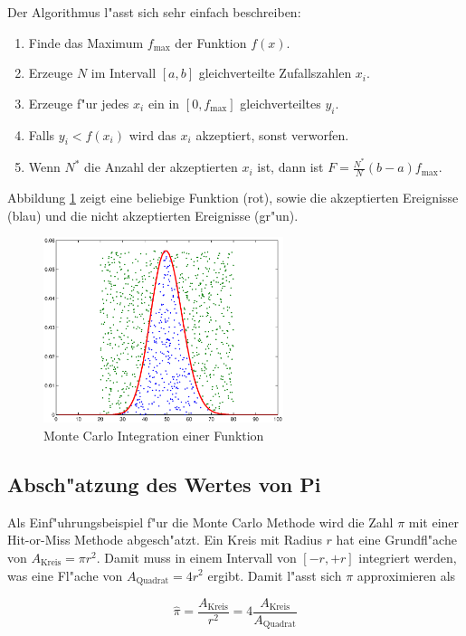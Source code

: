 \begin{refsection}
Der Algorithmus l"asst sich sehr einfach beschreiben:

\begin{enumerate}
\item Finde das Maximum $f_{\max}$ der Funktion $f(x)$.
\item Erzeuge $N$ im Intervall $[a,b]$ gleichverteilte Zufallszahlen $x_i$.
\item Erzeuge f"ur jedes $x_i$ ein in $[0,f_{\max}]$ gleichverteiltes $y_i$.
\item Falls $y_i < f(x_i)$ wird das $x_i$ akzeptiert, sonst verworfen.
\item Wenn $N^*$ die Anzahl der akzeptierten $x_i$ ist, dann ist $F =
\frac{N^*}{N}(b-a)f_{\max}$.
\end{enumerate}

Abbildung \ref{fig:integration_histogram} zeigt eine beliebige Funktion
(rot), sowie die akzeptierten Ereignisse (blau) und die nicht akzeptierten
Ereignisse (gr"un).

\begin{figure}[htbp]
	\centering
	\includegraphics[width=7cm]{montecarlo/images/integration_poisson.eps}
	\caption{Monte Carlo Integration einer Funktion}
	\label{fig:integration_histogram}
\end{figure}

\subsection{Absch"atzung des Wertes von Pi}
Als Einf"uhrungsbeispiel f"ur die Monte Carlo Methode wird die Zahl $\pi$
mit einer Hit-or-Miss Methode abgesch"atzt. Ein Kreis mit Radius $r$
hat eine Grundfl"ache von $A_{\text{Kreis}} = \pi r^{2}$.  Damit muss
in einem Intervall von $[-r,+r]$ integriert werden, was eine Fl"ache
von $A_{\text{Quadrat}} = 4r^2$ ergibt. Damit l"asst sich $\pi$
approximieren als

\begin{equation}
	\hat{\pi} = \frac{A_{\text{Kreis}}}{r^2} = 4 \frac{A_{\text{Kreis}}}{A_{\text{Quadrat}}}
\end{equation}


\end{refsection}

